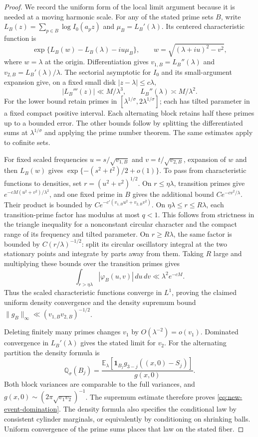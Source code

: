 \documentclass[11pt,a4paper]{article}
\theoremstyle{definition}
\theoremstyle{remark}\newtheorem{remark}[theorem]{Remark}
\begin{document}
\begin{proof}
We record the uniform form of the local limit argument because it is needed
at a moving harmonic scale.  For any of the stated prime sets $B$, write
$L_B(z)=\sum_{p\in B}\log I_0(a_pz)$ and $\mu_B=L_B'(\lambda)$.
Its centered characteristic function is
\[
 \exp\{L_B(w)-L_B(\lambda)-iu\mu_B\},\qquad
 w=\sqrt{(\lambda+iu)^2-v^2},
\]
where $w=\lambda$ at the origin.  Differentiation gives
$v_{1,B}=L_B''(\lambda)$ and $v_{2,B}=L_B'(\lambda)/\lambda$.
The sectorial asymptotic for $I_0$ and its small-argument expansion give,
on a fixed small disk $|z-\lambda|\leq c\lambda$,
\[
 |L_B'''(z)|\ll M/\lambda^3,\qquad
 L_B''(\lambda)\asymp M/\lambda^2.
\]
For the lower bound retain primes in
$[\lambda^{1/\sigma},2\lambda^{1/\sigma}]$; each has tilted parameter in
a fixed compact positive interval.  Each alternating block retains half
these primes up to a bounded error.  The other bounds follow by splitting
the differentiated sums at $\lambda^{1/\sigma}$ and applying the prime
number theorem.  The same estimates apply to cofinite sets.

For fixed scaled frequencies $u=s/\sqrt{v_{1,B}}$ and
$v=t/\sqrt{v_{2,B}}$, expansion of $w$ and then $L_B(w)$ gives
$\exp\{-(s^2+t^2)/2+o(1)\}$.  To pass from characteristic functions to
densities, set $r=(u^2+v^2)^{1/2}$.  On $r\leq\eta\lambda$, transition
primes give $e^{-cM(u^2+v^2)/\lambda^2}$, and one fixed prime in $B$ gives
the additional bound $Ce^{-cv^2/\lambda}$.  Their product is bounded by
$C e^{-c'(v_{1,B}u^2+v_{2,B}v^2)}$.  On
$\eta\lambda\leq r\leq R\lambda$, each transition-prime factor has
modulus at most $q<1$.  This follows from strictness in the triangle
inequality for a nonconstant circular character and the compact range of
its frequency and tilted parameter.  On $r\geq R\lambda$, the same
factor is bounded by $C(r/\lambda)^{-1/2}$: split its circular oscillatory
integral at the two stationary points and integrate by parts away from
them.  Taking $R$ large and multiplying these bounds over the transition
primes gives
\[
 \int_{r>\eta\lambda}|\varphi_B(u,v)|\,du\,dv
     \ll\lambda^2e^{-cM}.
\]
Thus the scaled characteristic functions converge in $L^1$, proving the
claimed uniform density convergence and the density supremum bound
$\|g_B\|_\infty\ll(v_{1,B}v_{2,B})^{-1/2}$.

Deleting finitely many primes changes $v_1$ by $O(\lambda^{-2})=o(v_1)$.
Dominated convergence in $L_B'(\lambda)$ gives the stated limit for $v_2$.
For the alternating partition the density formula is
\[
 \mathbb Q_\sigma(B_j)=
 \frac{\mathbb E_\lambda[\mathbf1_{B_j}g_{3-j}((x,0)-S_j)]}{g(x,0)}.
\]
Both block variances are comparable to the full variances, and
$g(x,0)\sim(2\pi\sqrt{v_1v_2})^{-1}$.  The supremum estimate therefore
proves \eqref{eq:new-event-domination}.  The density formula also specifies
the conditional law by consistent cylinder marginals, or equivalently by
conditioning on shrinking balls.  Uniform convergence of the prime sums
places that law on the stated fiber.
\end{proof}
\end{document}
